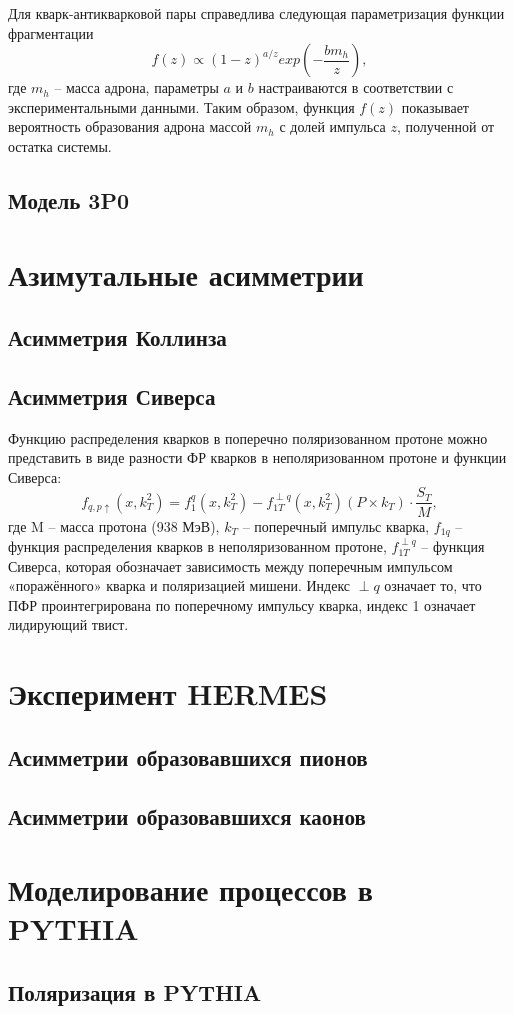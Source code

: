 \documentclass{extarticle}
\begin{document}
Для кварк-антикварковой пары справедлива следующая параметризация функции фрагментации
\begin{equation}
	f(z) \propto (1-z)^{a/z} exp(- \frac{b m_h}{z}),
\end{equation}
где $m_h$ – масса адрона, параметры $a$ и $b$ настраиваются в соответствии с экспериментальными данными. Таким образом, функция $f(z)$ показывает вероятность образования адрона массой $m_h$ с долей импульса $z$, полученной от остатка системы.
\subsection{Модель 3P0}
\newpage
\section{Азимутальные асимметрии}

\subsection{Асимметрия Коллинза}
\subsection{Асимметрия Сиверса}
Функцию распределения кварков в поперечно поляризованном протоне можно представить в виде разности ФР кварков в неполяризованном протоне и функции Сиверса:
\begin{equation}
	f_{q,p\uparrow} (x,k^2_T )=f_1^q (x,k^2_T )-f_{1T}^{\perp q} (x,k^2_T )(P\times k_T ) \cdot \frac{S_T}{M},
\end{equation}
где M – масса протона (938 МэВ), $k_T$ – поперечный импульс кварка, $f_{1q}$ – функция распределения кварков в неполяризованном протоне, $f_{1T}^{\perp q}$ – функция Сиверса, которая обозначает зависимость между поперечным импульсом «поражённого» кварка и поляризацией мишени. Индекс $\perp q$ означает то, что ПФР проинтегрирована по поперечному импульсу кварка, индекс 1 означает лидирующий твист.
\newpage
\section{Эксперимент HERMES}
\subsection{Асимметрии образовавшихся пионов}
\subsection{Асимметрии образовавшихся каонов}
\newpage 
\section{Моделирование процессов в PYTHIA}
\subsection{Поляризация в PYTHIA}
\newpage


\printbibliography
\end{document}
